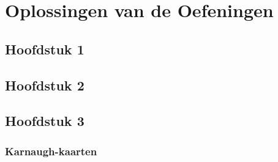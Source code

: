 \chapter{Oplossingen van de Oefeningen}
\section{Hoofdstuk 1}
\section{Hoofdstuk 2}
\section{Hoofdstuk 3}
\subsection{Karnaugh-kaarten}
